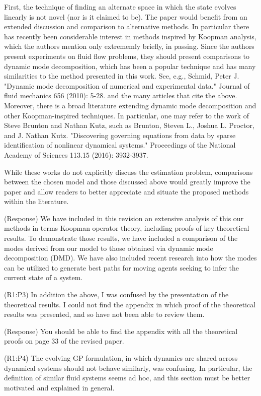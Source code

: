 \documentclass{letter}
\begin{document}
First, the technique of finding an alternate space in which the state
evolves linearly is not novel (nor is it claimed to be). The paper
would benefit from an extended discussion and comparison to alternative
methods. In particular there has recently been considerable interest in
methods inspired by Koopman analysis, which the authors mention only
extrememly briefly, in passing. Since the authors present experiments
on fluid flow problems, they should present comparisons to dynamic mode
decomposition, which has been a popular technique and has many
similarities to the method presented in this work. See, e.g.,
Schmid, Peter J. "Dynamic mode decomposition of numerical and
experimental data." Journal of fluid mechanics 656 (2010): 5-28.
and the many articles that cite the above. Moreover, there is a broad
literature extending dynamic mode decomposition and other
Koopman-inspired techniques. In particular, one may refer to the work
of Steve Brunton and Nathan Kutz, such as 
Brunton, Steven L., Joshua L. Proctor, and J. Nathan Kutz. "Discovering
governing equations from data by sparse identification of nonlinear
dynamical systems." Proceedings of the National Academy of Sciences
113.15 (2016): 3932-3937.

While these works do not explicitly discuss the estimation problem,
comparisons between the chosen model and those discussed above would
greatly improve the paper and allow readers to better appreciate and
situate the proposed methods within the literature. 

{\color{red}(Response)} We have included in this revision an extensive analysis of this our methods in terms Koopman operator theory, including proofs of key theoretical results. To demonstrate those results, we have included a comparison of the modes derived from our model to those obtained via dynamic mode decomposition (DMD). We have also included recent research into how the modes can be utilized to generate best paths for moving agents seeking to infer the current state of a system.

{\color{red}(R1:P3)} In addition the above, I was confused by the presentation of the
theoretical results. I could not find the appendix in which proof of
the theoretical results was presented, and so have not been able to
review them. 

{\color{red}(Response)} You should be able to find the appendix with all the theoretical proofs on page 33 of the revised paper.

{\color{red}(R1:P4)} The evolving GP formulation, in which dynamics are shared across
dynamical systems should not behave similarly, was confusing. In
particular, the definition of similar fluid systems seems ad hoc, and
this section must be better motivated and explained in general. 
\end{document}
